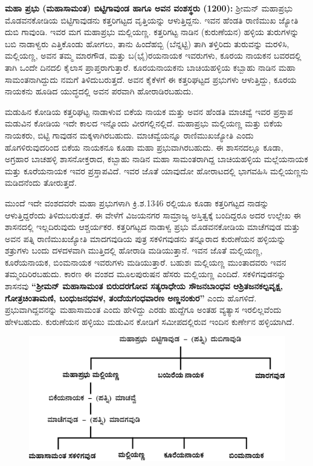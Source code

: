 \textbf{ಮಹಾ ಪ್ರಭು (ಮಹಾಸಾಮಂತ) ಬಿಟ್ಟಿಗಾವುಂಡ ಹಾಗೂ ಅವನ ವಂಶಸ್ಥರು (1200):} ಶ‍್ರೀಮನ್​ ಮಹಾಪ್ರಭು ಮೊಡವನಕೋಡಿಯ ಬಿಟ್ಟಿಗಾವುಡನು ಕತ್ತರಿಗಟ್ಟದ ವೃತ್ತಿಯನ್ನು ಆಳುತ್ತಿದ್ದನು. ಇವನ ಹೆಂಡತಿ ರಾಣಿಮುಖ ಜ್ಯೋತಿ ದುಬಿ ಗಾವುಂಡಿ. ಇವರ ಮಗ ಮಹಾಪ್ರಭು ಮಲ್ಲಿಯಣ್ಣ. ಕತ್ತರಿಗಟ್ಟ ನಾಡಿನ (ಕುರುಣೆಯನ) ಹಳ್ಳಿಯ ತುರುಗಳನ್ನು ಬಬಿ ನಾಡಾಳ್ವರು ಎತ್ತಿಕೊಂಡು ಹೋಗಲು, ತಾನು ಹಿಂದೆಹಬ್ಬಿ (ಬೆನ್ನಟ್ಟಿ) ತಾಗಿ ತಳ್ತಿರಿದು ತುರುವನ್ನು ಮರಳಿಸಿ, ಮಲ್ಲಿಯಣ್ಣ, ಅವನ ತಮ್ಮ ಮಾರಗೌಡ, ಮತ್ತು ಬ(ಭೈ)ರಯನಾಯಕ ಇವರುಗಳು, ಕೂರಯ ನಾಯಕನ ಬವರದಲ್ಲಿ ತಾಗಿ ಒಂದೇ ದಿನದಲಿ ಕೈಲಾಸ ಪ್ರಾಪ್ತರಾಗುತ್ತಾರೆ. ಕೂರಯನಾಯಕನು ಬಾಚಿಯಹಳ್ಳಿಯ ಕಬ್ಬಾಹು ನಾಡಿನ ಮಹಾ ಸಾಮಂತನಾಗಿದ್ದುದು ನಮಗೆ ತಿಳಿದುಬರುತ್ತದೆ. ಅವನ ಕೈಕೆಳಗೆ ಈ ಕತ್ತರಿಘಟ್ಟದ ಪ್ರಭುಗಳು ಆಳುತ್ತಿದ್ದು, ಕೂರಯ ನಾಯಕನು ಹೂಡಿದ ಯುದ್ಧದಲ್ಲಿ ಅವನ ಪರವಾಗಿ ಹೋರಾಡಿರಬಹುದು.

ಮಡುಹಿನ ಕೋಡಿಯ ಕತ್ತರಿಘಟ್ಟ ನಾಡಾಳುವ ಬಿಕೆಯ ನಾಯಕ ಮತ್ತು ಅವನ ಹೆಂಡತಿ ಮಾಚವ್ವೆ ಇವರ ಪ್ರಸ್ತಾಪ ಮಡುವಿನ ಕೋಡಿಯ ಇದೇ ಕಾಲದ ಇನ್ನೊಂದು ವೀರಗಲ್ಲಿನಲ್ಲಿದೆ. ಮಹಾಪ್ರಭು ಮಲ್ಲಿಯಣ್ಣ ಮತ್ತು ಬಿಕೆಯ ನಾಯಕರು, ಬಿಟ್ಟಿ ಗಾವುಡನ ಮಕ್ಕಳಾಗಿರಬಹುದು. ಮಾಚವ್ವೆಯನ್ನೂ ರಾಣಿಮುಖಜ್ಯೋತಿ ಎಂದು ಹೊಗಳಿರುವುದರಿಂದ ಬಿಕೆಯ ನಾಯಕನೂ ಕೂಡಾ ಮಹಾ ಪ್ರಭುವಾಗಿರಬಹುದು. ಈ ಶಾಸನದಲ್ಲೂ ಕೂಡಾ, ಅಗ್ರಹಾರ ಬಾಚಹಳ್ಳಿ ಶಾಸನೋಕ್ತರಾದ, ಕಬ್ಬಾಹು ನಾಡಿನ ಮಹಾ ಸಾಮಂತರಾಗಿದ್ದ ಬಾಚಿಯಹಳ್ಳಿಯ ಮಲ್ಲೆಯನಾಯಕ ಮತ್ತು ಕೂರೆಯನಾಯಕ ಇವರ ಪ್ರಸ್ತಾಪವಿದೆ. ಇವರ ಜೊತೆ ಯಾವುದೋ ಹೋರಾಟದಲ್ಲಿ ಭಾಗವಹಿಸಿ ಮಲ್ಲಿಯಣ್ಣನು ಮಡಿದನೆಂದು ತೋರುತ್ತದೆ.

ಮುಂದೆ ಇದೇ ವಂಶದವರೇ ಮಹಾ ಪ್ರಭುಗಳಾಗಿ ಕ್ರಿ.ಶ.1346 ರಲ್ಲಿಯೂ ಕೂಡಾ ಕತ್ತರಿಗಟ್ಟದ ನಾಡನ್ನು ಆಳುತ್ತಿದ್ದರೆಂದು ತಿಳಿದುಬರುತ್ತದೆ. ಈ ವೇಳೆಗೆ ವಿಜಯನಗರ ಸಾಮ್ರಾಜ್ಯ ಅಸ್ತಿತ್ವಕ್ಕೆ ಬಂದಿದ್ದರೂ ಅದರ ಉಲ್ಲೇಖ ಈ ಶಾಸನದಲ್ಲಿ ಇಲ್ಲದಿರುವುದು ಆಶ್ಚರ್ಯಕರ. ಕತ್ತರಿಗಟ್ಟದ ನಾಡಾಳ್ವ ಪ್ರಭು ಮೊಡವನಕೋಡಿಯ ಮಾಚೆಗವುಡ ಮತ್ತು ಅವನ ಪತ್ನಿ ರಾಣಿಮುಖಜ್ಯೋತಿ ಮಾದಗವುಡಿಯ ಪುತ್ರ ಸಕಳಿಗವುಡನು ತನ್ನೂರಾದ ಕುರುಣೆಯನ ಹಳ್ಳಿಯನ್ನು ಶತ್ರುಗಳು ಬಂದು ದಳದಳವಾಗಿ ಮುತ್ತಿದಲ್ಲಿ ಹೋರಾಡಿ ಮಡಿಯುತ್ತಾನೆ. ಇವನ ಜೊತೆ ಮಲ್ಲಿಯಣ್ಣ, ಕೂರೆಯನಾಯಕ, ಬಿಂಮನಾಯಕ ಇವರುಗಳು ಮಡಿಯುತ್ತಾರೆ. ಬಹುಶಃ ಮಲ್ಲಿಯಣ್ಣ ಮುಂತಾದವರು ಇವನ ತಮ್ಮಂದಿರಿರಬಹುದು. ಕಾರಣ ಈ ವಂಶದ ಮೂಲಪುರುಷನ ಹೆಸರು ಮಲ್ಲಿಯಣ್ಣ ಎಂದಿದೆ. ಸಕಳಿಗವುಡನನ್ನು ಶಾಸನವು \textbf{“ಶ‍್ರೀಮನ್ ಮಹಾಸಾಮಂತ ಬಿರುದರಗೋವ ಸತ್ಯರಾಧೇಯ ಸೌಜನಬಾಂಧವ ಆಶ್ರಿತಜನಕಲ್ಪವೃಕ್ಷ, ಗೋತ್ರಚಿಂತಾಮಣಿ, ಬಂಧುಜನಧವಳ, ತಂದೆಯಗಂಧವಾರಣ\general{\break } ಅಣ್ಣನಂಕುರ”} ಎಂದು ಹೊಗಳಿದೆ. ಪ್ರಭುವಾಗಿದ್ದವನನ್ನು ಮಹಾಸಾಮಂತ ಎಂದು ಹೇಳಿದ್ದು ಎರಡು ಹುದ್ದೆಗೂ ಅಂತಹ ವ್ಯತ್ಯಾಸ ಇರಲಿಲ್ಲವೆಂದು ಹೇಳಬಹುದು. ಕುರುಣೆಯನ ಹಳ್ಳಿಯು ಮಡುವಿನ ಕೋಡಿಗೆ ಸಮೀಪದಲ್ಲಿರುವ ಇಂದಿನ ಕುರ್ಣೇನ ಹಳ್ಳಿಯಾಗಿದೆ.

\begin{figure}[H]
\includegraphics[scale=1.3]{images/chap3/chap3fig10.jpeg}
\end{figure}

